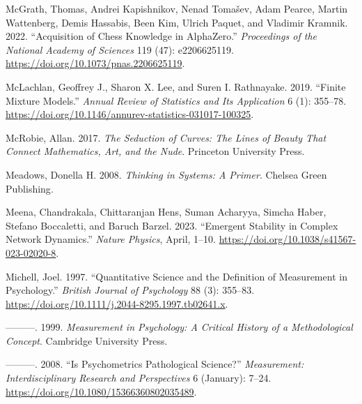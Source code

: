 \documentclass[
  a4paper,
  DIV=11,
  numbers=noendperiod,
  oneside]{scrreprt}
\newlength{\cslhangindent}
\newlength{\cslentryspacingunit} %
\newenvironment{CSLReferences}[2] %
 {%
  \setlength{\parindent}{0pt}
  \ifodd #1
  \let\oldpar\par
  \def\par{\hangindent=\cslhangindent\oldpar}
  \fi
  \setlength{\parskip}{#2\cslentryspacingunit}
 }%
 {}
\begin{document}
\begin{CSLReferences}{1}{0}
\leavevmode{}%
McGrath, Thomas, Andrei Kapishnikov, Nenad Tomašev, Adam Pearce, Martin
Wattenberg, Demis Hassabis, Been Kim, Ulrich Paquet, and Vladimir
Kramnik. 2022. {``Acquisition of Chess Knowledge in {AlphaZero}.''}
\emph{Proceedings of the National Academy of Sciences} 119 (47):
e2206625119. \url{https://doi.org/10.1073/pnas.2206625119}.

\leavevmode{}%
McLachlan, Geoffrey J., Sharon X. Lee, and Suren I. Rathnayake. 2019.
{``Finite {Mixture Models}.''} \emph{Annual Review of Statistics and Its
Application} 6 (1): 355--78.
\url{https://doi.org/10.1146/annurev-statistics-031017-100325}.

\leavevmode{}%
McRobie, Allan. 2017. \emph{The {Seduction} of {Curves}: {The Lines} of
{Beauty That Connect Mathematics}, {Art}, and the {Nude}}. {Princeton
University Press}.

\leavevmode{}%
Meadows, Donella H. 2008. \emph{Thinking in {Systems}: {A Primer}}.
{Chelsea Green Publishing}.

\leavevmode{}%
Meena, Chandrakala, Chittaranjan Hens, Suman Acharyya, Simcha Haber,
Stefano Boccaletti, and Baruch Barzel. 2023. {``Emergent Stability in
Complex Network Dynamics.''} \emph{Nature Physics}, April, 1--10.
\url{https://doi.org/10.1038/s41567-023-02020-8}.

\leavevmode{}%
Michell, Joel. 1997. {``Quantitative Science and the Definition of
Measurement in Psychology.''} \emph{British Journal of Psychology} 88
(3): 355--83. \url{https://doi.org/10.1111/j.2044-8295.1997.tb02641.x}.

\leavevmode{}%
---------. 1999. \emph{Measurement in {Psychology}: {A Critical History}
of a {Methodological Concept}}. {Cambridge University Press}.

\leavevmode{}%
---------. 2008. {``Is {Psychometrics Pathological Science}?''}
\emph{Measurement: Interdisciplinary Research and Perspectives} 6
(January): 7--24. \url{https://doi.org/10.1080/15366360802035489}.


\end{CSLReferences}
\end{document}
